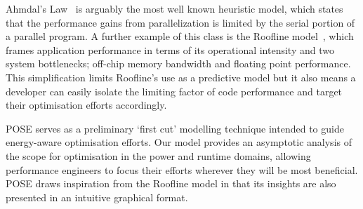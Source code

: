 Ahmdal's Law~\cite{amdahl:1967aa} is arguably the most well known heuristic model, which states that the performance gains from parallelization is limited by the serial portion of a parallel program.
A further example of this class is the Roofline model~\cite{williams:2009aa}, which frames application performance in terms of its operational intensity and two system bottlenecks; off-chip memory bandwidth and floating point performance.
This simplification limits Roofline's use as a predictive model but it also means a developer can easily isolate the limiting factor of code performance and target their optimisation efforts accordingly.

POSE serves as a preliminary `first cut' modelling technique intended to guide energy-aware optimisation efforts.
Our model provides an asymptotic analysis of the scope for optimisation in the power and runtime domains, allowing performance engineers to focus their efforts wherever they will be most beneficial.
POSE draws inspiration from the Roofline model in that its insights are also presented in an intuitive graphical format.

